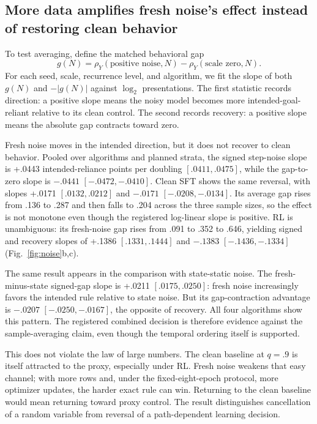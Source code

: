 \documentclass[11pt,a4paper]{article}
\newcommand{\rhoY}{\rho_Y}
\newcommand{\fig}[1]{Fig.~\ref{#1}}
\begin{document}
\subsection*{More data amplifies fresh noise's effect instead of restoring clean behavior}

To test averaging, define the matched behavioral gap
\[
g(N)=\rhoY(\text{positive noise},N)-\rhoY(\text{scale zero},N).
\]
For each seed, scale, recurrence level, and algorithm, we fit the slope of both $g(N)$ and $-|g(N)|$ against $\log_2$ presentations. The first statistic records direction: a positive slope means the noisy model becomes more intended-goal-reliant relative to its clean control. The second records recovery: a positive slope means the absolute gap contracts toward zero.

Fresh noise moves in the intended direction, but it does not recover to clean behavior. Pooled over algorithms and planned strata, the signed step-noise slope is +.0443 intended-reliance points per doubling $[.0411,.0475]$, while the gap-to-zero slope is $-.0441$ $[-.0472,-.0410]$. Clean SFT shows the same reversal, with slopes +.0171 $[.0132,.0212]$ and $-.0171$ $[-.0208,-.0134]$. Its average gap rises from .136 to .287 and then falls to .204 across the three sample sizes, so the effect is not monotone even though the registered log-linear slope is positive. RL is unambiguous: its fresh-noise gap rises from .091 to .352 to .646, yielding signed and recovery slopes of +.1386 $[.1331,.1444]$ and $-.1383$ $[-.1436,-.1334]$ (\fig{fig:noise}b,c).

The same result appears in the comparison with state-static noise. The fresh-minus-state signed-gap slope is +.0211 $[.0175,.0250]$: fresh noise increasingly favors the intended rule relative to state noise. But its gap-contraction advantage is $-.0207$ $[-.0250,-.0167]$, the opposite of recovery. All four algorithms show this pattern. The registered combined decision is therefore evidence against the sample-averaging claim, even though the temporal ordering itself is supported.

This does not violate the law of large numbers. The clean baseline at $q=.9$ is itself attracted to the proxy, especially under RL. Fresh noise weakens that easy channel; with more rows and, under the fixed-eight-epoch protocol, more optimizer updates, the harder exact rule can win. Returning to the clean baseline would mean returning toward proxy control. The result distinguishes cancellation of a random variable from reversal of a path-dependent learning decision.
\end{document}
